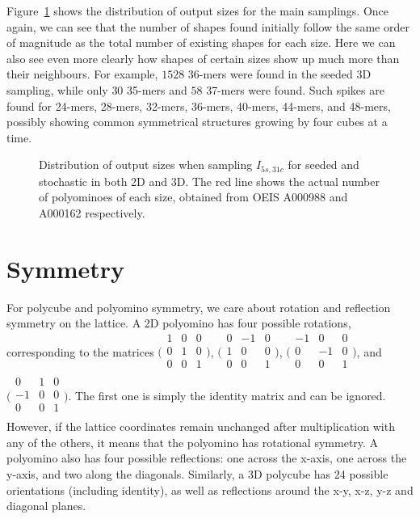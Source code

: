 Figure~\ref{fig:main_distr} shows the distribution of output sizes for the main samplings. Once again, we can see that the number of shapes found initially follow the same order of magnitude as the total number of existing shapes for each size. Here we can also see even more clearly how shapes of certain sizes show up much more than their neighbours. For example, \(1528\) 36-mers were found in the seeded 3D sampling, while only \(30\) 35-mers and \(58\) 37-mers were found. Such spikes are found for 24-mers, 28-mers, 32-mers, 36-mers, 40-mers, 44-mers, and 48-mers, possibly showing common symmetrical structures growing by four cubes at a time.


\begin{figure}[h]
    \centering
    \caption{Distribution of output sizes when sampling \(I_{5s,31c}\) for seeded and stochastic in both 2D and 3D. The red line shows the actual number of polyominoes of each size, obtained from OEIS A000988 and A000162 \cite{sloane1995encyclopedia, oeisA000988} respectively.}
    \label{fig:main_distr}
\end{figure}

\section{Symmetry}

For polycube and polyomino symmetry, we care about rotation and reflection symmetry on the lattice. A 2D polyomino has four possible rotations, corresponding to the matrices $\big(\begin{smallmatrix}
    1 & 0 & 0\\
    0 & 1 & 0\\
    0 & 0 & 1\\
\end{smallmatrix}\big)$, $\big(\begin{smallmatrix}
    0 & -1 & 0\\
    1 & 0 & 0\\
    0 & 0 & 1\\
\end{smallmatrix}\big)$, $\big(\begin{smallmatrix}
    -1 & 0 & 0\\
    0 & -1 & 0\\
    0 & 0 & 1\\
\end{smallmatrix}\big)$, and $\big(\begin{smallmatrix}
    0 & 1 & 0\\
    -1 & 0 & 0\\
    0 & 0 & 1\\
\end{smallmatrix}\big)$. The first one is simply the identity matrix and can be ignored. However, if the lattice coordinates remain unchanged after multiplication with any of the others, it means that the polyomino has rotational symmetry. A polyomino also has four possible reflections: one across the x-axis, one across the y-axis, and two along the diagonals. Similarly, a 3D polycube has 24 possible orientations (including identity), as well as reflections around the x-y, x-z, y-z and diagonal planes.

